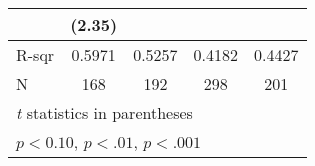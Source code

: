 {\begin{tabular}{l*{4}{c}}
                         &      (2.35)         &                     &                     &                     \\
\midrule
R-sqr                    &      0.5971         &      0.5257         &      0.4182         &      0.4427         \\
N                        &         168         &         192         &         298         &         201         \\
\bottomrule
\multicolumn{5}{l}{\footnotesize \textit{t} statistics in parentheses}\\
\multicolumn{5}{l}{\footnotesize \sym{*} \(p<0.10\), \sym{**} \(p<.01\), \sym{***} \(p<.001\)}\\
\end{tabular}
}
